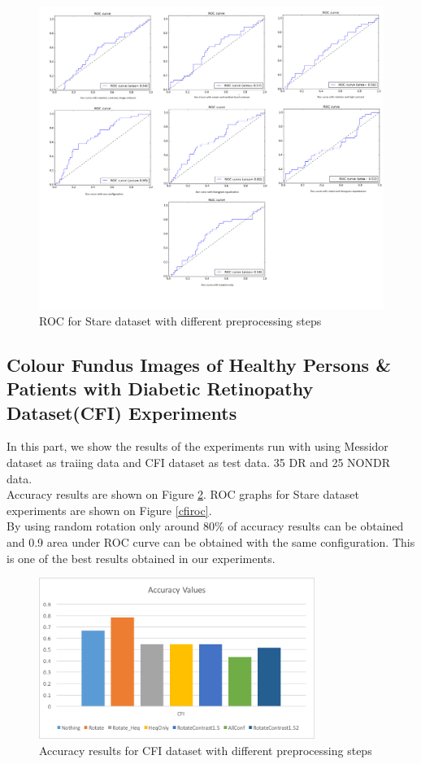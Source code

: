 \begin{figure}[!htbbp]
\centering
\includegraphics[width=1.0\textwidth]{Figures/stare.png}
\caption{ROC for Stare dataset with different preprocessing steps}
\label{stareroc}
\end{figure}

\subsection{Colour Fundus Images of Healthy Persons \& Patients with Diabetic Retinopathy Dataset(CFI) Experiments}
In this part, we show the results of the experiments run with using Messidor dataset as traiing data and CFI dataset \citep{alipour2012analysis} as test data. 35 DR and 25 NONDR data.\\
Accuracy results are shown on Figure \ref{cfiacc}. ROC graphs for Stare dataset experiments are shown on Figure \ref{cfiroc}.\\
By using random rotation only around 80\% of accuracy results can be obtained and 0.9 area under ROC curve can be obtained with the same configuration. This is one of the best results obtained in our experiments. 

\begin{figure}[!htbbp]
\centering
\includegraphics[width=0.8\textwidth]{Figures/cfiacc.png}
\caption{Accuracy results for CFI dataset with different preprocessing steps}
\label{cfiacc}
\end{figure}

